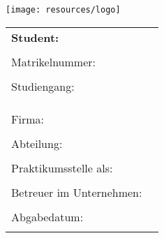 
\begin{titlepage}


\vspace*{-5cm}

\begin{flushleft}
	\hspace*{-3cm} \texttt{[image: resources/logo]}
\end{flushleft}

\vspace{0.5cm}

\begin{flushleft}
	\Huge{\textbf{\thema}}
\end{flushleft}

\vspace{1.5cm}

\begin{flushleft}
	\begin{tabular}{@{}p{5cm}p{8.5cm}}
		

		\textbf{Student:} & \textbf{\autor} \\
		& \\
		Matrikelnummer: & \matrikelnummer \\
		& \\
		Studiengang: & \studiengang \\
		& \\
		& \\
		& \\
		Firma: & \firma \\
		& \\
		Abteilung: & \abteilung  \\[.5ex]
		& \\
		Praktikumsstelle als: & \praktikumsstelle  \\[.5ex]
		& \\
		Betreuer im Unternehmen: & \betreuer  \\[.5ex]
		& \\
		Abgabedatum: & \abgabedatum \\
		& \\
	\end{tabular}
\end{flushleft}

\iffalse
\begin{center}
	\Huge{
		\textbf{\thema} \\[5cm]
	}
	\huge{
		\textbf{\autor}} \\[1cm]
	\normalsize{
		\textbf{Praktikant als \praktikumsstelle}} \\[0.5cm]
	\normalsize{
		\textbf{bei}} \\[0.5cm]
	\normalsize{
		\textbf{\firma} \\[6.5cm]
	}
	\Large{
		\textbf{Konstanz, \abgabedatum} \\[2.3cm]
	}
	
\end{center}
\fi

\end{titlepage}